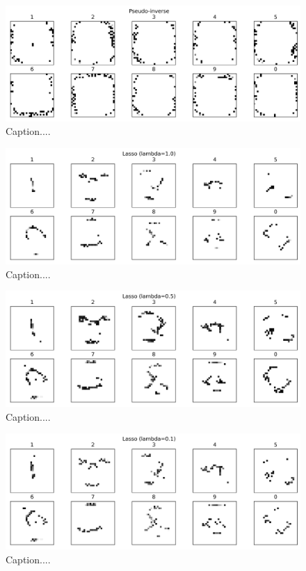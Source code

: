 \documentclass[10pt]{article}
\begin{document}
\begin{figure}[ht]
\centerline{\includegraphics[scale=0.75]{figures/weight_matrix_pinv_geq_90th_no_zeros.png}}
\caption{Caption....}
\label{fig15}
\end{figure}

\begin{figure}[ht]
\centerline{\includegraphics[scale=0.75]{figures/weight_matrix_lasso_1_geq_90th_no_zeros.png}}
\caption{Caption....}
\label{fig16}
\end{figure}

\begin{figure}[ht]
\centerline{\includegraphics[scale=0.75]{figures/weight_matrix_lasso_05_geq_90th_no_zeros.png}}
\caption{Caption....}
\label{fig17}
\end{figure}

\begin{figure}[ht]
\centerline{\includegraphics[scale=0.75]{figures/weight_matrix_lasso_01_geq_90th_no_zeros.png}}
\caption{Caption....}
\label{fig18}
\end{figure}
\end{document}
